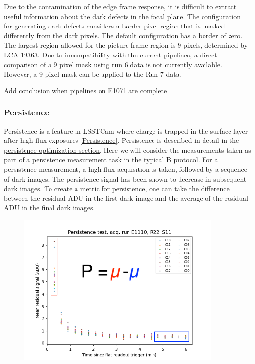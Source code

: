 Due to the contamination of the edge frame response, it is difficult to
extract useful information about the dark defects in the focal plane.
The configuration for generating dark defects considers a border pixel
region that is masked differently from the dark pixels. The default
configuration has a border of zero. The largest region allowed for the
picture frame region is 9 pixels, determined by LCA-19363. Due to
incompatibility with the current pipelines, a direct comparison of a 9
pixel mask using run 6 data is not currently available. However, a 9
pixel mask can be applied to the Run 7 data.

Add conclusion when pipelines on E1071 are complete

\subsubsection{Persistence}\label{persistence}

Persistence is a feature in LSSTCam where charge is trapped in the
surface layer after high flux exposures
\hyperref[persistence-2]{{[}Persistence{]}}. Persistence is described in
detail in the
\href{https://sitcomtn-148.lsst.io/\#persistence-optimization}{persistence
optimization section}. Here we will consider the measurements taken as
part of a persistence measurement task in the typical B protocol. For a
persistence measurement, a high flux acquisition is taken, followed by a
sequence of dark images. The persistence signal has been shown to
decrease in subsequent dark images. To create a metric for persistence,
one can take the difference between the residual ADU in the first dark
image and the average of the residual ADU in the final dark images.

\begin{figure}
\begin{centering}
\includegraphics[width=0.9\textwidth]{sections/figures/baselineCharacterization/persistence_plot_LSSTCam_R22_S11_u_lsstccs_eo_persistence_E1110_w_2024_35_20240926T235141Z.png}
\end{centering}
\end{figure}

